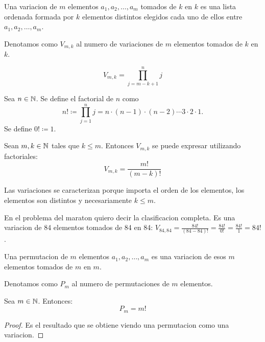 \begin{definition}
	Una variacion de \(m \) elementos \(a_1,a_{2}, \ldots, a_m \) tomados de \(k \) en \(k \) es una lista ordenada formada por \(k \) elementos distintos elegidos cada uno de ellos entre \(a_1,a_2,\ldots,a_m \).
	
	Denotamos como \(V_{m,k} \) al numero de variaciones de \(m \) elementos tomados de \(k \) en \(k \).
	
	\[
		V_{m,k} = \prod\limits_{j=m-k+1}^{n } j
	\]
\end{definition}

\begin{definition}
	Sea \(n \in \mathbb{N} \). Se define el factorial de \(n \) como
	\[
		n! \coloneqq \prod\limits_{j=1}^{n } j = n \cdot (n-1) \cdot (n-2) \cdots 3 \cdot 2 \cdot 1.
	\]
	Se define \(0! \coloneqq 1 \).
\end{definition}

\vspace{2cm}
\begin{theorem}
	Sean \(m,k\in  \mathbb{N}\) tales que \(k \leq m \). Entonces
	\(V_{m,k}\) se puede expresar utilizando factoriales:
	\[
		V_{m,k} = \frac{m!}{(m-k)!}
	\]
\end{theorem}

Las variaciones se caracterizan porque importa el orden de los elementos, los elementos son distintos y necesariamente \(k \leq m \).

\begin{example}
	En el problema del maraton quiero decir la clasificacion completa. Es una variacion de 84 elementos tomados de 84 en 84:  \(V_{84,84} = \frac{84!}{(84-84)!}= \frac{84!}{0!} = \frac{84!}{1} = 84!\).
\end{example}

\begin{definition}
	Una permutacion de \(m \) elementos \(a_1,a_2, \ldots, a_m \) es una variacion de esos \(m \) elementos tomados de \(m \) en \(m \).
	
	Denotamos como \(P_m \) al numero de permutaciones de \(m \) elementos.
\end{definition}

\begin{theorem}
	Sea \(m \in \mathbb{N} \). Entonces:
	\[
		P_m = m!
	\]
\end{theorem}
\begin{proof}
	Es el resultado que se obtiene viendo una permutacion como una variacion.
\end{proof}

